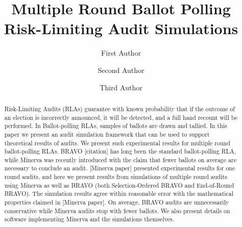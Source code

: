 \documentclass[runningheads]{llncs}
\begin{document}
%
\title{Multiple Round Ballot Polling Risk-Limiting Audit Simulations}
%
%
\author{First Author \and
Second Author \and
Third Author}
%
%
%
\maketitle              %
%
\begin{abstract}
    Risk-Limiting Audits (RLAs) guarantee with known probability 
    that if the outcome of an 
    election is incorrectly announced, it will be detected, 
    and a full hand recount will be performed. 
    In Ballot-polling RLAs, samples of ballots are drawn and tallied.
    In this paper we present an audit simulation framework
    that can be used to support theoretical results of audits.
    We present such experimental results for multiple round 
    ballot-polling RLAs.
    BRAVO [citation] has long been the standard ballot-polling RLA,
    while Minerva was recently introduced with the claim
    that fewer ballots on average are necessary to conclude 
    an audit.
    [Minerva paper] presented experimental
    results for one round audits, and here
    we present results
    from simulations of multiple round audits using Minerva 
    as well as BRAVO 
    (both Selection-Ordered 
    BRAVO and End-of-Round BRAVO).
    The simulation results agree within reasonable error with
    the mathematical properties claimed in [Minerva paper].
    On average, BRAVO audits are unnecessarily conservative 
    while Minerva audits stop with fewer ballots. We also
    present details on software implementing Minerva and
    the simulations themselves.

\end{abstract}
%
%
%
\end{document}
